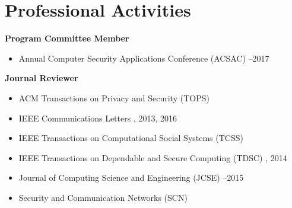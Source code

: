 \section*{Professional Activities}
\begin{description}
\item {\bf Program Committee Member}
  \begin{itemize}
  \item Annual Computer Security Applications Conference (ACSAC)
    --2017
  \end{itemize}

\item {\bf Journal Reviewer}
  \begin{itemize}
  \item ACM Transactions on Privacy and Security (TOPS)
  \item IEEE Communications Letters
    , 2013, 2016
  \item IEEE Transactions on Computational Social Systems (TCSS)
  \item IEEE Transactions on Dependable and Secure Computing (TDSC)
    , 2014
  \item Journal of Computing Science and Engineering (JCSE)
    --2015
  \item Security and Communication Networks (SCN)
  \end{itemize}

\end{description}
